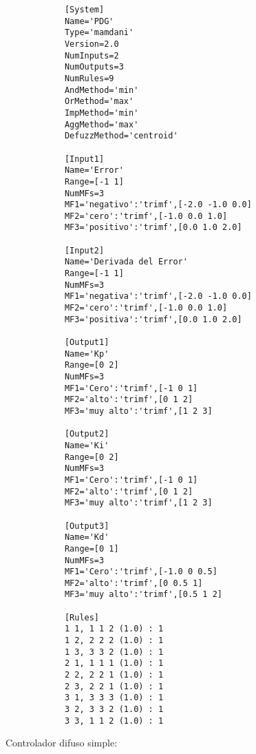     \begin{longlisting}				
        \begin{verbatim}
            [System]
            Name='PDG'
            Type='mamdani'
            Version=2.0
            NumInputs=2
            NumOutputs=3
            NumRules=9
            AndMethod='min'
            OrMethod='max'
            ImpMethod='min'
            AggMethod='max'
            DefuzzMethod='centroid'

            [Input1]
            Name='Error'
            Range=[-1 1]
            NumMFs=3
            MF1='negativo':'trimf',[-2.0 -1.0 0.0]
            MF2='cero':'trimf',[-1.0 0.0 1.0]
            MF3='positivo':'trimf',[0.0 1.0 2.0]

            [Input2]
            Name='Derivada del Error'
            Range=[-1 1]
            NumMFs=3
            MF1='negativa':'trimf',[-2.0 -1.0 0.0]
            MF2='cero':'trimf',[-1.0 0.0 1.0]
            MF3='positiva':'trimf',[0.0 1.0 2.0]

            [Output1]
            Name='Kp'
            Range=[0 2]
            NumMFs=3
            MF1='Cero':'trimf',[-1 0 1]
            MF2='alto':'trimf',[0 1 2]
            MF3='muy alto':'trimf',[1 2 3]

            [Output2]
            Name='Ki'
            Range=[0 2]
            NumMFs=3
            MF1='Cero':'trimf',[-1 0 1]
            MF2='alto':'trimf',[0 1 2]
            MF3='muy alto':'trimf',[1 2 3]

            [Output3]
            Name='Kd'
            Range=[0 1]
            NumMFs=3
            MF1='Cero':'trimf',[-1.0 0 0.5]
            MF2='alto':'trimf',[0 0.5 1]
            MF3='muy alto':'trimf',[0.5 1 2]

            [Rules]
            1 1, 1 1 2 (1.0) : 1
            1 2, 2 2 2 (1.0) : 1
            1 3, 3 3 2 (1.0) : 1
            2 1, 1 1 1 (1.0) : 1
            2 2, 2 2 1 (1.0) : 1
            2 3, 2 2 1 (1.0) : 1
            3 1, 3 3 3 (1.0) : 1
            3 2, 3 3 2 (1.0) : 1
            3 3, 1 1 2 (1.0) : 1
        \end{verbatim}
    \end{longlisting}

    Controlador difuso simple:

